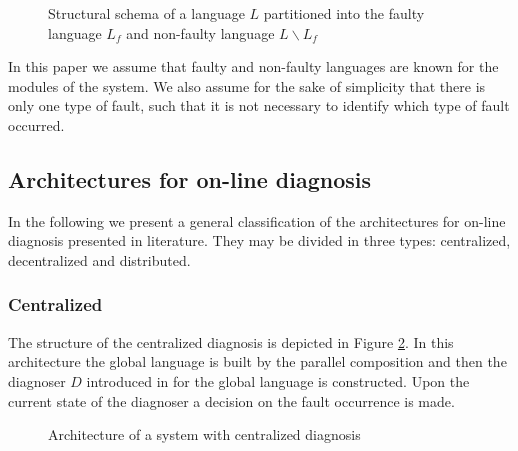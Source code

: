 \documentclass[a4paper, 10pt, conference]{ieeeconf} \IEEEoverridecommandlockouts
\begin{document}
\begin{figure}[t]
\centering

\caption{Structural schema of a language $L$ partitioned into the faulty
language $L_f$ and non-faulty language $L \backslash L_f$}
\label{fig_partitioning_faulty}
\end{figure}

In this paper we assume that faulty and non-faulty languages are known for the
modules of the system. We also assume for the sake of simplicity that there is
only one type of fault, such that it is not necessary to identify
which type of fault occurred.

\subsection{Architectures for on-line diagnosis}
In the following we present a general classification of the
architectures for on-line diagnosis presented in literature. They may be divided
in three types: centralized, decentralized and distributed. 

\subsubsection{Centralized}
The structure of the centralized diagnosis is depicted in 
Figure \ref{fig_centralized}. In this architecture the global language is
built by the parallel composition and then the diagnoser $D$ introduced in
\cite{sampath_diagnosability_1995} for the global language is constructed. Upon
the current state of the diagnoser a decision on the fault occurrence is made.

\begin{figure}[t]
\centering
{}
\caption{Architecture of a system with centralized diagnosis}
\label{fig_centralized}
\end{figure}
\end{document}
